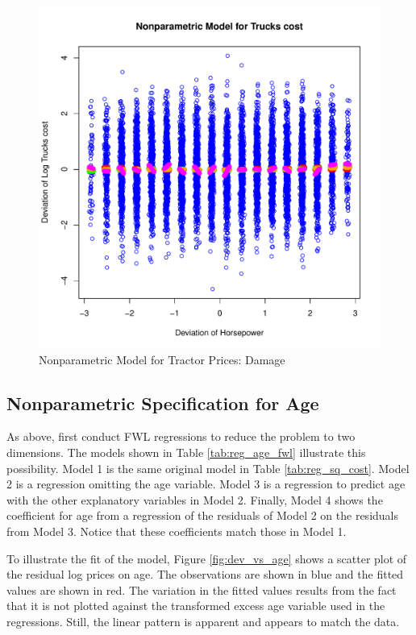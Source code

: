 \documentclass[11pt]{paper}
\begin{document}
\begin{figure}[h!]
  \centering
  \includegraphics[scale = 0.5, keepaspectratio=true]{../Figures/dev_np_vs_damage_dev_bw}
  \caption{Nonparametric Model for Tractor Prices: Damage} \label{fig:dev_np_vs_damage_dev_bw}
\end{figure}





\clearpage
\subsection{Nonparametric Specification for Age}

As above, first conduct FWL regressions 
to reduce the problem to two dimensions. 
The models shown in
Table \ref{tab:reg_age_fwl}
illustrate this possibility. 
Model 1 is the same original model in 
Table \ref{tab:reg_sq_cost}. 
Model 2 is a regression omitting the age variable. 
Model 3 is a regression to predict age with the other explanatory variables in Model 2.
Finally, Model 4 shows the coefficient for age
from a regression of the residuals of Model 2
on the residuals from Model 3. 
Notice that these coefficients match those in Model 1. 



\pagebreak 
To illustrate the fit of the model, 
Figure \ref{fig:dev_vs_age} shows a scatter plot 
of the residual log prices on age. 
The observations are shown in blue
and the fitted values are shown in red.
The variation in the fitted values results from the 
fact that it is not plotted against the transformed excess age variable used in the regressions.
Still, the linear pattern is apparent
and appears to match the data. 
\end{document}
